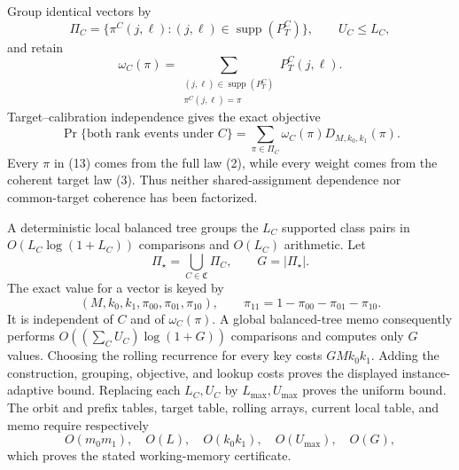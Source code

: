Group identical vectors by
\[
\Pi_C=\{\pi^C(j,\ell):(j,\ell)\in\operatorname{supp}(P_T^C)\},\qquad U_C\le L_C, \tag{11}
\]
and retain
\[
\omega_C(\pi)=\sum_{\substack{(j,\ell)\in\operatorname{supp}(P_T^C)\\
\pi^C(j,\ell)=\pi}}P_T^C(j,\ell). \tag{12}
\]
Target--calibration independence gives the exact objective
\[
\Pr\{\text{both rank events under }C\}
=\sum_{\pi\in\Pi_C}\omega_C(\pi)D_{M,k_0,k_1}(\pi). \tag{13}
\]
Every \(\pi\) in (13) comes from the full law (2), while every weight comes from the coherent target law (3).  Thus neither shared-assignment dependence nor common-target coherence has been factorized.

A deterministic local balanced tree groups the \(L_C\) supported class pairs in \(O(L_C\log(1+L_C))\) comparisons and \(O(L_C)\) arithmetic.  Let
\[
\Pi_\star=\bigcup_{C\in\mathfrak C}\Pi_C,\qquad G=|\Pi_\star|. \tag{14}
\]
The exact value for a vector is keyed by
\[
(M,k_0,k_1,\pi_{00},\pi_{01},\pi_{10}),\qquad
\pi_{11}=1-\pi_{00}-\pi_{01}-\pi_{10}. \tag{15}
\]
It is independent of \(C\) and of \(\omega_C(\pi)\).  A global balanced-tree memo consequently performs \(O((\sum_CU_C)\log(1+G))\) comparisons and computes only \(G\) values.  Choosing the rolling recurrence for every key costs \(GMk_0k_1\).  Adding the construction, grouping, objective, and lookup costs proves the displayed instance-adaptive bound.  Replacing each \(L_C,U_C\) by \(L_{\max},U_{\max}\) proves the uniform bound.  The orbit and prefix tables, target table, rolling arrays, current local table, and memo require respectively
\[
O(m_0m_1),\quad O(L),\quad O(k_0k_1),\quad O(U_{\max}),\quad O(G),
\]
which proves the stated working-memory certificate.

